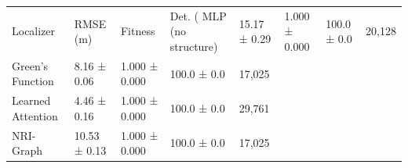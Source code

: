 \begin{tabular}{lllll}
\toprule
Localizer & RMSE (m) & Fitness & Det. (%
\midrule
MLP (no structure) & 15.17 ± 0.29 & 1.000 ± 0.000 & 100.0 ± 0.0 & 20,128 \\
Green's Function & 8.16 ± 0.06 & 1.000 ± 0.000 & 100.0 ± 0.0 & 17,025 \\
Learned Attention & 4.46 ± 0.16 & 1.000 ± 0.000 & 100.0 ± 0.0 & 29,761 \\
NRI-Graph & 10.53 ± 0.13 & 1.000 ± 0.000 & 100.0 ± 0.0 & 17,025 \\
\bottomrule
\end{tabular}
